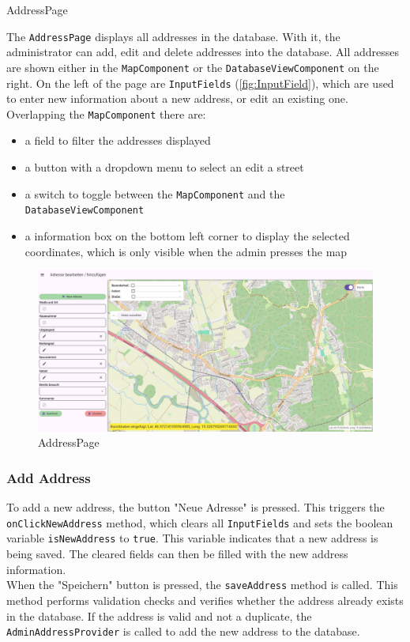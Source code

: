 \begin{subsection}{AddressPage}

The \texttt{AddressPage} displays all addresses in the database. With it, the administrator can add, edit and delete addresses into the database. All addresses are shown either in the \texttt{MapComponent} or the \texttt{DatabaseViewComponent} on the right. On the left of the page are \texttt{InputFields} (\ref{fig:InputField}), which are used to enter new information about a new address, or edit an existing one. Overlapping the \texttt{MapComponent} there are:
\begin{itemize}
  \item a field to filter the addresses displayed
  \item a button with a dropdown menu to select an edit a street
  \item a switch to toggle between the \texttt{MapComponent} and the \texttt{DatabaseViewComponent}
  \item a information box on the bottom left corner to display the selected coordinates, which is only visible when the admin presses the map
\end{itemize}

\begin{figure}[H]
    \centering
    \includegraphics[width=0.9\linewidth]{images/AdminPanel/AddressPage.png}
    \caption{AddressPage}
\end{figure}
\end{subsection}

\label{fig:Add Address}
\subsubsection{Add Address}
To add a new address, the button "Neue Adresse" is pressed. This triggers the \texttt{onClickNewAddress} method, which clears all \texttt{InputFields} and sets the boolean variable \texttt{isNewAddress} to \texttt{true}. This variable indicates that a new address is being saved. The cleared fields can then be filled with the new address information.\\When the "Speichern" button is pressed, the \texttt{saveAddress} method is called. This method performs validation checks and verifies whether the address already exists in the database. If the address is valid and not a duplicate, the \texttt{AdminAddressProvider} is called to add the new address to the database.

